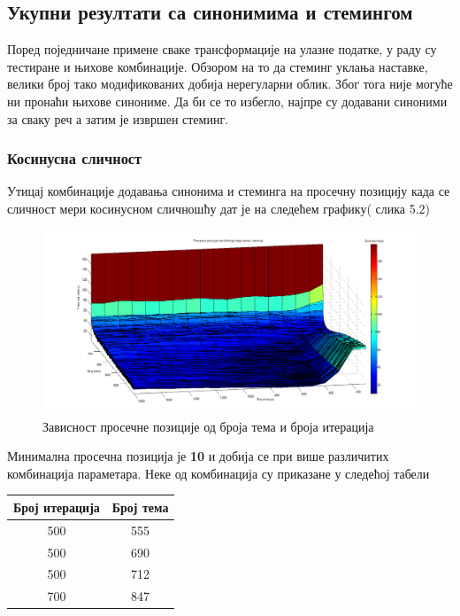 \subsection{Укупни резултати са синонимима и стемингом}

Поред поједничане примене сваке трансформације на улазне податке, у раду су тестиране и њихове комбинације. Обзором на то да стеминг уклања наставке, велики број тако модификованих добија нерегуларни облик. Због тога није могуће ни пронаћи њихове синониме. Да би се то избегло, најпре су додавани синоними за сваку реч а затим је извршен стеминг.

\subsubsection{Косинусна сличност}



Утицај  комбинације додавања синонима и стеминга на просечну позицију  када се сличност мери косинусном сличношћу дат је на следећем графику( слика 5.2)

		\begin{figure}[H]
    \centering
   \includegraphics[scale=0.3]{./Slike/StemmSyn.png} 
	\caption{Зависност просечне позиције од броја тема и броја итерација}
	\label{fig:slika1}
\end{figure}

Минимална просечна позиција је \textbf{10} и добија се при више различитих комбинација параметара. Неке од комбинација су приказане у следећој табели

\begin{center}
\begin{tabular}{|c|c|}
\hline
Број итерација & Број тема \\
\hline\hline
500 & 555 \\
500 & 690 \\
500 & 712 \\
700 & 847 \\
\hline
\end{tabular}
\end{center}

